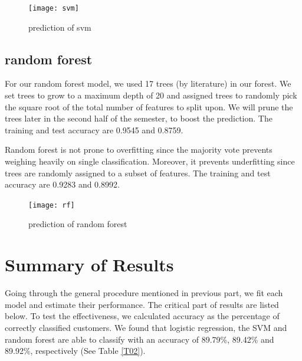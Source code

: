 \documentclass{mytemplate}%
\begin{document}
\begin{multicols}{2}
\begin{figure}[H]
  \centering
  \texttt{[image: svm]}\\
  \caption{prediction of svm}\label{g09}
\end{figure}


\subsection{random forest}

For our random forest model, we used 17 trees (by literature) in our forest. We set trees to grow to a maximum depth of 20 and assigned trees to randomly pick the square root of the total number of features to split upon. We will prune the trees later in the second half of the semester, to boost the prediction. The training and test accuracy are 0.9545 and 0.8759.

Random forest is not prone to overfitting since the majority vote prevents weighing heavily on single classification. Moreover, it prevents underfitting since trees are randomly assigned to a subset of features. The training and test accuracy are 0.9283 and  0.8992.

\begin{figure}[H]
  \centering
  \texttt{[image: rf]}\\
  \caption{prediction of random forest}\label{g10}
\end{figure}


\section{\color{blue}Summary of Results}
Going through the general procedure mentioned in previous part, we fit each model and estimate their performance. The critical part of results are listed below. To test the effectiveness, we calculated accuracy as the percentage of correctly classified customers. We found that logistic regression, the SVM and random forest are able to classify with an accuracy of 89.79\%, 89.42\% and 89.92\%, respectively (See {\color{red}Table \ref{T02}}). 


\end{multicols}
\end{document}
